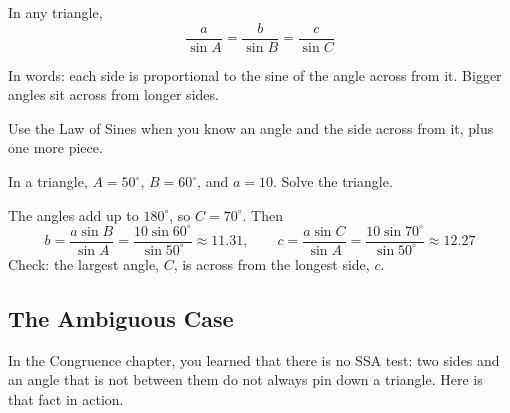 \begin{mdframed}[style = important, frametitle = {The Law of Sines}]
In any triangle,
$$\frac{a}{\sin A} = \frac{b}{\sin B} = \frac{c}{\sin C}$$
\end{mdframed}

In words: each side is proportional to the sine of the angle across from it.
Bigger angles sit across from longer sides.

Use the Law of Sines when you know an angle and the side across from it, plus one
more piece.

\begin{Worked}
\begin{Problem}
In a triangle, $A = 50^\circ$, $B = 60^\circ$, and $a = 10$. Solve
the triangle.
\end{Problem}
\begin{Solution}
The angles add up to $180^\circ$, so $C = 70^\circ$. Then
$$b = \frac{a\sin B}{\sin A} = \frac{10\sin 60^\circ}{\sin 50^\circ} \approx 11.31, \qquad
c = \frac{a\sin C}{\sin A} = \frac{10\sin 70^\circ}{\sin 50^\circ} \approx 12.27$$
Check: the largest angle, $C$, is across from the longest side, $c$.
\end{Solution}
\end{Worked}

\subsection{The Ambiguous Case}
In the Congruence chapter, you learned that there is no SSA test: two sides and an
angle that is not between them do not always pin down a triangle. Here is that
fact in action.

